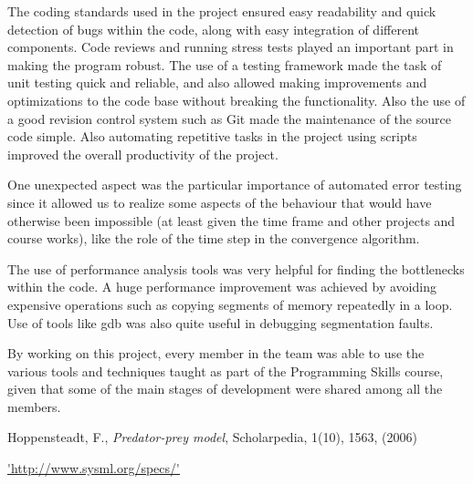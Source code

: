 \documentclass[12pt,a4paper]{article}
\begin{document}
The coding standards used in the project ensured easy readability and quick detection of bugs within the code, along with easy integration of different components. Code reviews and running stress tests played an important part in making the program robust. The use of a testing framework made the task of unit testing quick and reliable, and also allowed making improvements and optimizations to the code base without breaking the functionality. Also the use of a good revision control system such as Git made the maintenance of the source code simple. Also automating repetitive tasks in the project using scripts improved the overall productivity of the project.
 
One unexpected aspect was the particular importance of automated error testing since it allowed us to realize some aspects of the behaviour that would have otherwise been impossible (at least given the time frame and other projects and course works), like the role of the time step in the convergence algorithm.

The use of performance analysis tools was very helpful for finding the bottlenecks within the code. A huge performance improvement was achieved by avoiding expensive operations such as copying segments of memory repeatedly in a loop. Use of tools like gdb was also quite useful in debugging segmentation faults.

By working on this project, every member in the team was able to use the various tools and techniques taught as part of the Programming Skills course, given that some of the main stages of development were shared among all the members.
 




\begin{thebibliography}{100}


 Hoppensteadt, F., \emph{Predator-prey model}, Scholarpedia, 1(10), 1563, (2006)

 \url{'http://www.sysml.org/specs/'}


\end{thebibliography}
\end{document}
